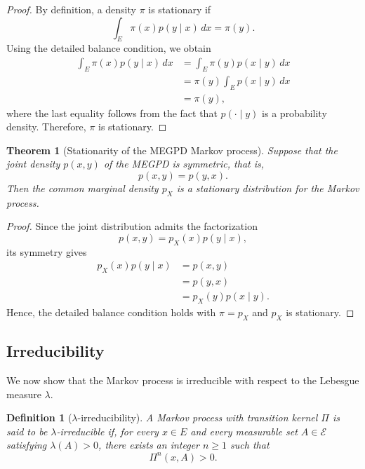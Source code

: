 \documentclass{article}
\newtheorem{definition}{Definition}[section]
\newtheorem{theorem}[theorem]{Theorem}
\begin{document}
\begin{proof}
  By definition, a density $\pi$ is stationary if
  \[
    \int_E \pi(x)p(y \mid x)\,dx = \pi(y).
  \]
  Using the detailed balance condition, we obtain
  \[
    \begin{aligned}
      \int_E \pi(x)p(y \mid x)\,dx
       & = \int_E \pi(y)p(x \mid y)\,dx \\
       & = \pi(y)\int_E p(x \mid y)\,dx \\
       & = \pi(y),
    \end{aligned}
  \]
  where the last equality follows from the fact that $p(\cdot \mid y)$ is a probability density. Therefore, $\pi$ is stationary.
\end{proof}

\begin{theorem}[Stationarity of the MEGPD Markov process]
  Suppose that the joint density $p(x,y)$ of the MEGPD is symmetric, that is,
  \[
    p(x,y) = p(y,x).
  \]
  Then the common marginal density $p_X$ is a stationary distribution for the Markov process.
\end{theorem}

\begin{proof}
  Since the joint distribution admits the factorization
  \[
    p(x,y) = p_X(x)p(y \mid x),
  \]
  its symmetry gives
  \[
    \begin{aligned}
      p_X(x)p(y \mid x)
       & = p(x,y)             \\
       & = p(y,x)             \\
       & = p_X(y)p(x \mid y).
    \end{aligned}
  \]
  Hence, the detailed balance condition holds with $\pi = p_X$ and $p_X$ is stationary.
\end{proof}

\subsection{Irreducibility}

We now show that the Markov process is irreducible with respect to the Lebesgue measure $\lambda$.

\begin{definition}[$\lambda$-irreducibility]
  A Markov process with transition kernel $\Pi$ is said to be $\lambda$-irreducible if, for every $x \in E$ and every measurable set $A \in \mathcal{E}$ satisfying $\lambda(A)>0$, there exists an integer $n \geq 1$ such that
  \[
    \Pi^n(x,A)>0.
  \]
\end{definition}
\end{document}
